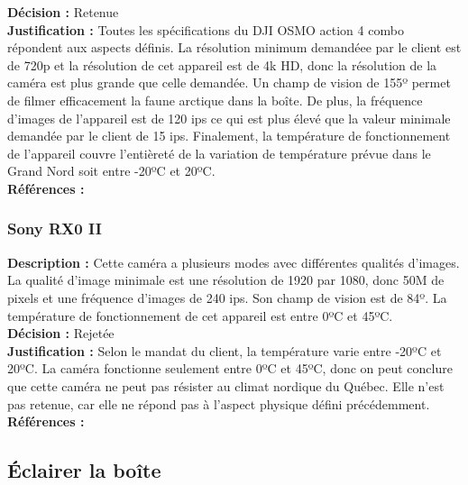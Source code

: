 \noindent
\textbf{Décision :} Retenue \\

\noindent
\textbf{Justification :} Toutes les spécifications du DJI OSMO action 4 combo répondent
aux aspects définis. La résolution minimum demandéee par le client est de 720p
et la résolution de cet appareil est de 4k HD, donc la résolution de la caméra
est plus grande que celle demandée. Un champ de vision de 155º permet de filmer
efficacement la faune arctique dans la boîte. De plus, la fréquence d’images de
l’appareil est de 120 ips ce qui est plus élevé que la valeur minimale demandée
par le client de 15 ips. Finalement, la température de fonctionnement de
l’appareil couvre l’entièreté de la variation de température prévue dans le
Grand Nord soit entre -20ºC et 20ºC. \\

\noindent
\textbf{Références :} \cite{3} \\

\subsubsection{Sony RX0 II}

\noindent
\textbf{Description :} Cette caméra a plusieurs modes avec différentes qualités d’images.
La qualité d’image minimale est une résolution de 1920 par 1080, donc 50M de
pixels et une fréquence d’images de 240 ips. Son champ de vision est de 84º. La
température de fonctionnement de cet appareil est entre 0ºC et 45ºC. \\

\noindent
\textbf{Décision :} Rejetée \\

\noindent
\textbf{Justification :} Selon le mandat du client, la température varie entre
-20ºC et 20ºC. La caméra fonctionne seulement entre 0ºC et 45ºC, donc on peut
conclure que cette caméra ne peut pas résister au climat nordique du Québec.
Elle n’est pas retenue, car elle ne répond pas à l’aspect physique défini
précédemment. \\

\noindent
\textbf{Références :} \cite{4} \\



\subsection{Éclairer la boîte}

